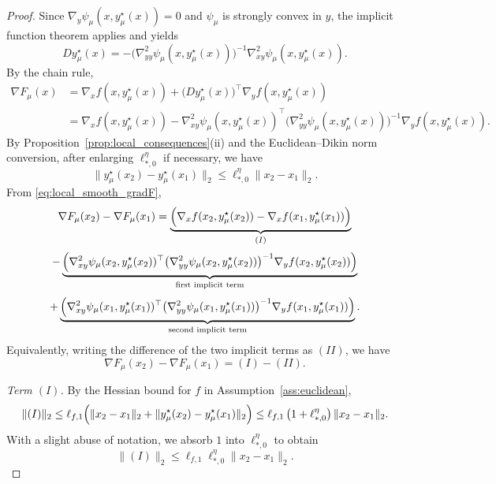 \documentclass{article}
\begin{document}
\begin{proof}
Since \(\nabla_y\psi_\mu(x,y_\mu^\star(x))=0\) and \(\psi_\mu\) is strongly convex in \(y\), the
implicit function theorem applies and yields
\[
Dy_\mu^\star(x)
=
-\bigl(\nabla^2_{yy}\psi_\mu(x,y_\mu^\star(x))\bigr)^{-1}
\nabla^2_{xy}\psi_\mu(x,y_\mu^\star(x)).
\]
By the chain rule,
\begin{align}
\nabla F_\mu(x)
&=
\nabla_x f(x,y_\mu^\star(x))
+
\bigl(Dy_\mu^\star(x)\bigr)^\top \nabla_y f(x,y_\mu^\star(x))
\nonumber\\
&=
\nabla_x f(x,y_\mu^\star(x))
-
\nabla^2_{xy}\psi_\mu(x,y_\mu^\star(x))^\top
\bigl(\nabla^2_{yy}\psi_\mu(x,y_\mu^\star(x))\bigr)^{-1}
\nabla_y f(x,y_\mu^\star(x)).
\label{eq:local_smooth_gradF}
\end{align}
By Proposition~\ref{prop:local_consequences}\textup{(ii)} and the Euclidean--Dikin norm conversion,
after enlarging \(\ell_{*,0}^\eta\) if necessary, we have
\begin{equation}
\label{eq:local_smooth_y_lip}
\|y_\mu^\star(x_2)-y_\mu^\star(x_1)\|_2
\le
\ell_{*,0}^\eta\|x_2-x_1\|_2.
\end{equation}
From \eqref{eq:local_smooth_gradF},
\[
\nabla F_\mu(x_2)-\nabla F_\mu(x_1)
=
\underbrace{
\Bigl(\nabla_x f(x_2,y_\mu^\star(x_2))
-
\nabla_x f(x_1,y_\mu^\star(x_1))\Bigr)
}_{(I)}
\]
\[
-
\underbrace{
\Bigl(
\nabla^2_{xy}\psi_\mu(x_2,y_\mu^\star(x_2))^\top
\bigl(\nabla^2_{yy}\psi_\mu(x_2,y_\mu^\star(x_2))\bigr)^{-1}
\nabla_y f(x_2,y_\mu^\star(x_2))
\Bigr)
}_{\text{first implicit term}}
\]
\[
+
\underbrace{
\Bigl(
\nabla^2_{xy}\psi_\mu(x_1,y_\mu^\star(x_1))^\top
\bigl(\nabla^2_{yy}\psi_\mu(x_1,y_\mu^\star(x_1))\bigr)^{-1}
\nabla_y f(x_1,y_\mu^\star(x_1))
\Bigr)
}_{\text{second implicit term}}.
\]
Equivalently, writing the difference of the two implicit terms as \((II)\), we have
\[
\nabla F_\mu(x_2)-\nabla F_\mu(x_1)=(I)-(II).
\]

\smallskip
\noindent\emph{Term \((I)\).}
By the Hessian bound for \(f\) in Assumption~\ref{ass:euclidean},
\[
\|(I)\|_2
\le
\ell_{f,1}
\Bigl(\|x_2-x_1\|_2+\|y_\mu^\star(x_2)-y_\mu^\star(x_1)\|_2\Bigr)
\le
\ell_{f,1}\left(1+\ell_{*,0}^\eta\right)\|x_2-x_1\|_2.
\]
With a slight abuse of notation, we absorb \(1\) into \(\ell_{*,0}^\eta\) to obtain
\[
\|(I)\|_2
\le
\ell_{f,1}\ell_{*,0}^\eta \|x_2-x_1\|_2.
\]


\end{proof}
\end{document}
